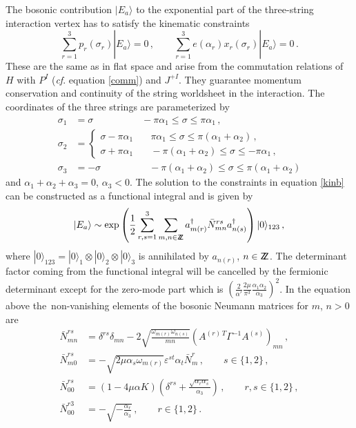 \documentclass[12pt]{article}
\def\G{\Gamma}
\def\a{\alpha}
\def\d{\delta}
\def\e{\varepsilon}
\def\m{\mu}
\def\s{\sigma}
\def\o{\omega}
\def\ra{\rangle}
\def\dg{\dagger}
\numberwithin{equation}{section} \setlength{\textwidth}{17cm}
\def\Zop{\bbbz}
\def\bbbz {{\sf Z\!\!Z}}
\begin{document}
\noindent The bosonic contribution $|E_a\ra$ to the exponential part of the three-string interaction
vertex has to satisfy the kinematic constraints \cite{gs,gsb}
\begin{equation}\label{kinb}
\sum_{r=1}^3p_r(\s_r)|E_a\ra=0\,,\qquad \sum_{r=1}^3e(\a_r)x_r(\s_r)|E_a\ra=0\,.
\end{equation}
These are the same as in flat space and arise from the commutation relations of $H$ with
$P^I$ ({\it cf}. equation \eqref{comm}) and $J^{+I}$.
They guarantee momentum conservation and continuity of the string worldsheet in the interaction. 
The coordinates of the three strings are parameterized by
\begin{align}
\s_1 & =\s \qquad\quad\qquad -\pi\a_1\le\s\le\pi\a_1\,, \nonumber \\
\s_2 & =\begin{cases} \s-\pi\a_1 & \quad\pi\a_1\le\s\le\pi(\a_1+\a_2)\,, \\
\s+\pi\a_1 & \quad-\pi(\a_1+\a_2)\le\s\le-\pi\a_1\,, \end{cases} \\
\s_3 & =-\s \qquad\quad\qquad -\pi(\a_1+\a_2)\le\s\le \pi(\a_1+\a_2)
\end{align}
and $\a_1+\a_2+\a_3=0$, $\a_3<0$.
The solution to the constraints in equation \eqref{kinb} can be constructed as a functional
integral and is given by \cite{sv}
\begin{equation}\label{bv}
|E_a\ra\sim\exp\left(\frac{1}{2}
\sum_{r,s=1}^3\sum_{m,n\in\Zop}a^{\dg}_{m(r)}\bar{N}^{rs}_{mn}a^{\dg}_{n(s)}
\right)|0\ra_{123}\,,
\end{equation}
where $|0\ra_{123}=|0\ra_1\otimes|0\ra_2\otimes|0\ra_3$ is annihilated by $a_{n(r)}$, $n\in\Zop$.
The determinant factor coming from the functional integral will be cancelled by the
fermionic determinant except for the zero-mode part which is
$\left(\frac{2}{\a'}\frac{2\m}{\pi^3}\frac{\a_1\a_2}{\a_3}\right)^2$.
In the equation above the~non-vanishing elements of the bosonic Neumann
matrices for $m$, $n>0$ are~\cite{sv}
\begin{align}
\label{mn} \bar{N}^{rs}_{mn} & =\d^{rs}\d_{mn}
-2\sqrt{\frac{\o_{m(r)}\o_{n(s)}}{mn}}\left(A^{(r)\,T}\G^{-1}A^{(s)}\right)_{mn}\,,\\
\label{m0} \bar{N}^{rs}_{m0} & =
-\sqrt{2\m\a_s\o_{m(r)}}\e^{st}\a_t\bar{N}^r_m\,,\qquad s\in\{1,2\}\,,\\
\label{00a} \bar{N}^{rs}_{00} & =
(1-4\m\a K)\left(\d^{rs}+\frac{\sqrt{\a_r\a_s}}{\a_3}\right)\,,\qquad  r,s\in\{1,2\}\,,\\
\label{00b} \bar{N}^{r3}_{00} & =
-\sqrt{-\frac{\a_r}{\a_3}}\,,\qquad
r\in\{1,2\}\,.
\end{align}
\end{document}
